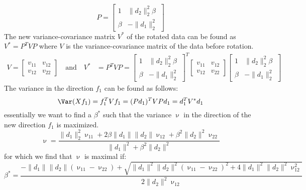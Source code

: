 \begin{equation}
P=\begin{bmatrix}
1 & \|d_2\|_2^2 \beta\\\beta & -\|d_1\|_2^2
\end{bmatrix}
\end{equation}
The new variance-covariance matrix $V^*$ of the rotated data can be found as $V^*=P^TVP$ where $V$ is the variance-covariance matrix of the data before rotation. 
\begin{align*}
V=\begin{bmatrix}
v_{11} & v_{12}\\v_{12} & v_{22}
\end{bmatrix}\quad \text{and}\quad V^* &= P^TVP=\begin{bmatrix}
1 & \|d_2\|_2^2 \beta\\\beta & -\|d_1\|_2^2
\end{bmatrix}^T\begin{bmatrix}
v_{11} & v_{12}\\v_{12} & v_{22}
\end{bmatrix}\begin{bmatrix}
1 & \|d_2\|_2^2 \beta\\\beta & -\|d_1\|_2^2
\end{bmatrix}
\end{align*}
The variance in the direction $f_1$ can be found as follows:
\begin{equation}
\Var(Xf_1)=f_1^TVf_1=(Pd_1)^TVPd_1=d_1^TV^*d_1
\end{equation}
essentially we want to find a $\beta^*$ such that the variance $\upnu$ in the direction of the new direction $f_1$ is maximized.
\begin{equation*}
\upnu=\frac{\|d_1\|_2^2\upnu_{11}+2\beta\|d_1\|\|d_2\|\upnu_{12}+\beta^2\|d_2\|^2\upnu_{22}}{\|d_1\|^2+\beta^2\|d_2\|^2}
\end{equation*}
for which we find that $\upnu$ is maximal if:
\begin{equation*}
\beta^*=\frac{-\|d_1\|\|d_2\|(\upnu_{11}-\upnu_{22})+\sqrt{\|d_1\|^2\|d_2\|^2(\upnu_{11}-\upnu_{22})^2+4\|d_1\|^2\|d_2\|^2\upnu_{12}^2}}{2\|d_2\|^2\upnu_{12}}
\end{equation*}
